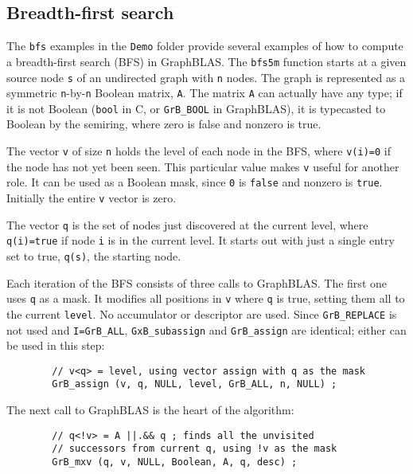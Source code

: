 \documentclass[12pt]{article}
\begin{document}
\subsection{Breadth-first search}
\label{bfs}

The \verb'bfs' examples in the \verb'Demo' folder provide several examples of
how to compute a breadth-first search (BFS) in GraphBLAS.  The \verb'bfs5m'
function starts at a given source node \verb's' of an undirected graph with
\verb'n' nodes.  The graph is represented as a symmetric \verb'n'-by-\verb'n'
Boolean matrix, \verb'A'.  The matrix \verb'A' can actually have any type; if
it is not Boolean (\verb'bool' in C, or \verb'GrB_BOOL' in GraphBLAS), it is
typecasted to Boolean by the semiring, where zero is false and nonzero is true.

The vector \verb'v' of size \verb'n' holds the level of each node in the
BFS, where \verb'v(i)=0' if the node has not yet been seen.  This particular
value makes \verb'v' useful for another role.  It can be used as a Boolean
mask, since \verb'0' is \verb'false' and nonzero is \verb'true'.
Initially the entire \verb'v' vector is zero.

The vector \verb'q' is the set of nodes just discovered at the current level,
where \verb'q(i)=true' if node \verb'i' is in the current level.  It starts out
with just a single entry set to true, \verb'q(s)', the starting node.

Each iteration of the BFS consists of three calls to GraphBLAS.  The first one
uses \verb'q' as a mask.  It modifies all positions in \verb'v' where \verb'q'
is true, setting them all to the current \verb'level'.  No accumulator or
descriptor are used.  Since \verb'GrB_REPLACE' is not used and
\verb'I=GrB_ALL', \verb'GxB_subassign' and \verb'GrB_assign' are identical;
either can be used in this step:

        {\footnotesize
        \begin{verbatim}
        // v<q> = level, using vector assign with q as the mask
        GrB_assign (v, q, NULL, level, GrB_ALL, n, NULL) ; \end{verbatim}}

The next call to GraphBLAS is the heart of the algorithm:

        {\footnotesize
        \begin{verbatim}
        // q<!v> = A ||.&& q ; finds all the unvisited
        // successors from current q, using !v as the mask
        GrB_mxv (q, v, NULL, Boolean, A, q, desc) ; \end{verbatim}}
\end{document}
